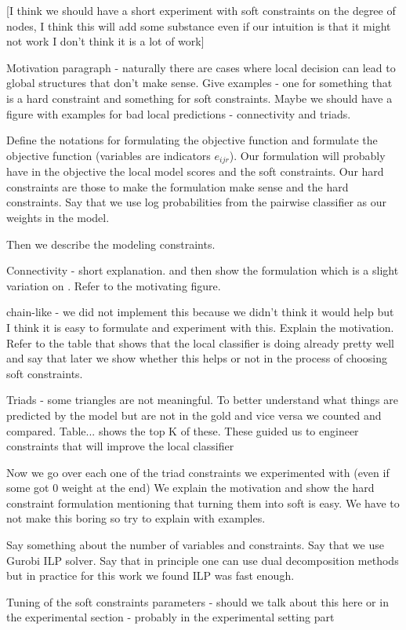 [I think we should have a short experiment with soft constraints on the degree of nodes, I think this will add some substance even if our intuition is that it might not work I don't think it is a lot of work]

Motivation paragraph - naturally there are cases where local decision can lead to global structures that don't make sense. Give examples - one for something that is a hard constraint and something for soft constraints. Maybe we should have a figure with examples for bad local predictions - connectivity and triads.

Define the notations for formulating the objective function and formulate the objective function (variables are indicators $e_{ijr}$). Our formulation will probably have in the objective the local model scores and the soft constraints. Our hard constraints are those to make the formulation make sense and the hard constraints. Say that we use log probabilities from the pairwise classifier as our weights in the model.

Then we describe the modeling constraints. 

Connectivity - short explanation. and then show the formulation which is a slight variation on \cite{Martins09}. Refer to the motivating figure. 

chain-like - we did not implement this because we didn't think it would help but I think it is easy to formulate and experiment with this. Explain the motivation. Refer to the table that shows that the local classifier is doing already pretty well and say that later we show whether this helps or not in the process of choosing soft constraints.

Triads - some triangles are not meaningful. To better understand what things are predicted by the model but are not in the gold and vice versa we counted and compared. Table... shows the top K of these. These guided us to engineer constraints that will improve the local classifier 

Now we go over each one of the triad constraints we experimented with (even if some got 0 weight at the end) We explain the motivation and show the hard constraint formulation mentioning that turning them into soft is easy. We have to not make this boring so try to explain with examples.

Say something about the number of variables and constraints. Say that we use Gurobi ILP solver. Say that in principle one can use dual decomposition methods but in practice for this work we found ILP was fast enough.

Tuning of the soft constraints parameters - should we talk about this here or in the experimental section - probably in the experimental setting part



